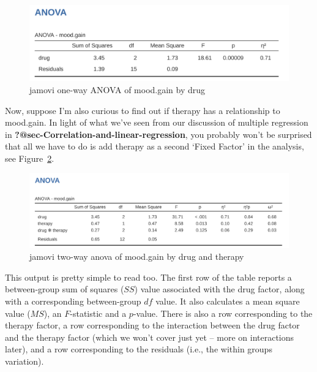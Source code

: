 \documentclass[
  a4paper,
]{book}
\begin{document}
\begin{figure}

\includegraphics[width=1\textwidth,height=\textheight]{images/fig14-2.png} \hfill{}

\caption{\label{fig-fig14-2}jamovi one-way ANOVA of mood.gain by drug}

\end{figure}

Now, suppose I'm also curious to find out if therapy has a relationship
to mood.gain. In light of what we've seen from our discussion of
multiple regression in \textbf{?@sec-Correlation-and-linear-regression},
you probably won't be surprised that all we have to do is add therapy as
a second `Fixed Factor' in the analysis, see Figure~\ref{fig-fig14-3}.

\begin{figure}

\includegraphics[width=1\textwidth,height=\textheight]{images/fig14-3.png} \hfill{}

\caption{\label{fig-fig14-3}jamovi two-way anova of mood.gain by drug
and therapy}

\end{figure}

This output is pretty simple to read too. The first row of the table
reports a between-group sum of squares (\(SS\)) value associated with
the drug factor, along with a corresponding between-group \(df\) value.
It also calculates a mean square value (\(MS\)), an \(F\)-statistic and
a \(p\)-value. There is also a row corresponding to the therapy factor,
a row corresponding to the interaction between the drug factor and the
therapy factor (which we won't cover just yet -- more on interactions
later), and a row corresponding to the residuals (i.e., the within
groups variation).
\end{document}
